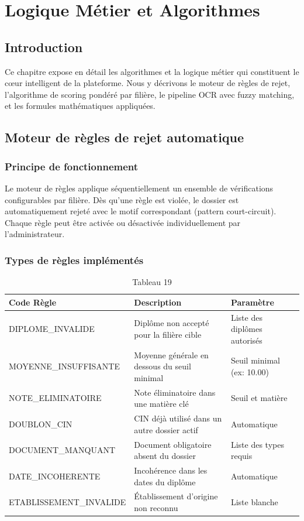 \chapter{Logique Métier et Algorithmes}

\section{Introduction}

Ce chapitre expose en détail les algorithmes et la logique métier qui constituent le cœur intelligent de la plateforme. Nous y décrivons le moteur de règles de rejet, l'algorithme de scoring pondéré par filière, le pipeline OCR avec fuzzy matching, et les formules mathématiques appliquées.

\section{Moteur de règles de rejet automatique}

\subsection{Principe de fonctionnement}

Le moteur de règles applique séquentiellement un ensemble de vérifications configurables par filière. Dès qu'une règle est violée, le dossier est automatiquement rejeté avec le motif correspondant (pattern court-circuit). Chaque règle peut être activée ou désactivée individuellement par l'administrateur.

\subsection{Types de règles implémentés}

\begin{table}[htbp]
\centering
\begin{tabular}{|l|l|l|}
\hline
Code Règle & Description & Paramètre \\
\hline
DIPLOME\_INVALIDE & Diplôme non accepté pour la filière cible & Liste des diplômes autorisés \\
\hline
MOYENNE\_INSUFFISANTE & Moyenne générale en dessous du seuil minimal & Seuil minimal (ex: 10.00) \\
\hline
NOTE\_ELIMINATOIRE & Note éliminatoire dans une matière clé & Seuil et matière \\
\hline
DOUBLON\_CIN & CIN déjà utilisé dans un autre dossier actif & Automatique \\
\hline
DOCUMENT\_MANQUANT & Document obligatoire absent du dossier & Liste des types requis \\
\hline
DATE\_INCOHERENTE & Incohérence dans les dates du diplôme & Automatique \\
\hline
ETABLISSEMENT\_INVALIDE & Établissement d'origine non reconnu & Liste blanche \\
\hline
\end{tabular}
\caption{Tableau 19}
\label{tab:table_19}
\end{table}

